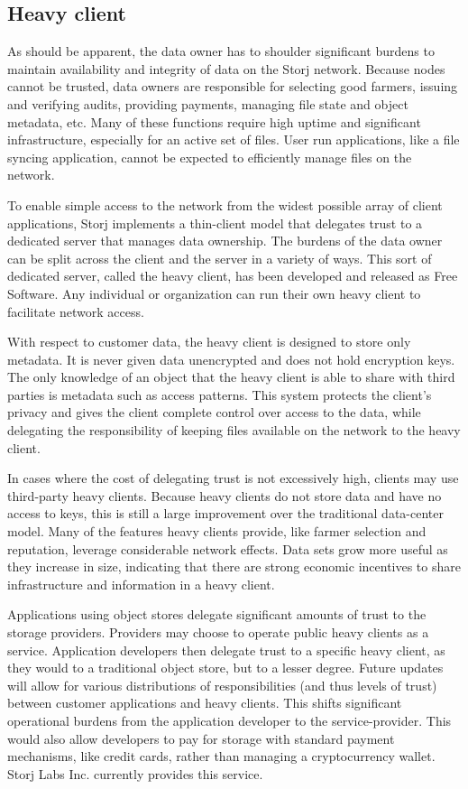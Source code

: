 \documentclass[a4paper,10pt]{article} \usepackage[utf8]{inputenc}
\begin{document}
\subsection{Heavy client}

As should be apparent, the data owner has to shoulder significant burdens
to maintain availability and integrity of data on the Storj network. Because
nodes cannot be trusted, data owners are responsible for selecting good
farmers, issuing and verifying audits, providing payments, managing file state
and object metadata, etc. Many of these functions require high uptime and
significant infrastructure, especially for an active set of files. User run
applications, like a file syncing application, cannot be expected to efficiently
manage files on the network.

To enable simple access to the network from the widest possible array of client
applications, Storj implements a thin-client model that delegates trust to a
dedicated server that manages data ownership. The burdens of the
data owner can be split across the client and the server in a variety of ways.
This sort of dedicated server, called the heavy client, has been developed and
released as Free Software. Any individual or organization can run their own
heavy client to facilitate network access.

With respect to customer data, the heavy client is designed to store only
metadata. It is never given data unencrypted and does not hold encryption keys.
The only knowledge of an object that the heavy client is able to share with
third parties is metadata such as access patterns. This system protects the
client's privacy and gives the client complete control over access to the data,
while delegating the responsibility of keeping files available on the network
to the heavy client.

In cases where the cost of delegating trust is not excessively high,
clients may use third-party heavy clients. Because heavy clients do not store
data and have no access to keys, this is still a large improvement over the
traditional data-center model. Many of the features heavy clients provide, like
farmer selection and reputation, leverage considerable network effects. Data
sets grow more useful as they increase in size, indicating that there are
strong economic incentives to share infrastructure and information in a heavy
client.

Applications using object stores delegate significant amounts of trust to the
storage providers. Providers may choose to operate public heavy clients as a
service.
Application developers then delegate trust to a specific heavy client, as they
would to a traditional object store, but to a lesser degree. Future updates
will allow for various distributions of responsibilities (and thus levels of
trust) between customer applications and heavy clients. This shifts significant
operational burdens from the application developer to the service-provider.
This would also allow developers to pay for storage with standard payment
mechanisms, like credit cards, rather than managing a cryptocurrency wallet.
Storj Labs Inc. currently provides this service.
\end{document}
